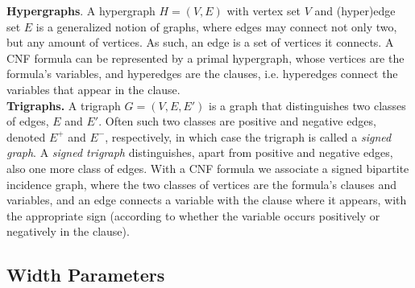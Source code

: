 \noindent
\textbf{Hypergraphs}.
A hypergraph $H=(V,E)$ with vertex set $V$ and (hyper)edge set $E$ is a generalized notion of graphs, where edges may connect not only two, but any amount of vertices.
As such, an edge is a set of vertices it connects.
A CNF formula can be represented by a primal hypergraph, whose vertices are the formula's variables, and hyperedges are the clauses, i.e. hyperedges connect the variables that appear in the clause.\\

\noindent
\textbf{Trigraphs.}
A trigraph $G=(V,E,E')$ is a graph that distinguishes two classes of edges, $E$ and $E'$.
Often such two classes are positive and negative edges, denoted $E^+$ and $E^-$, respectively, in which case the trigraph is called a {\em signed graph}.
A {\em signed trigraph} distinguishes, apart from positive and negative edges, also one more class of edges.
With a CNF formula we associate a signed bipartite incidence graph, where the two classes of vertices are the formula's clauses and variables, and an edge connects a variable with the clause where it appears, with the appropriate sign (according to whether the variable occurs positively or negatively in the clause).

\subsection{Width Parameters}


